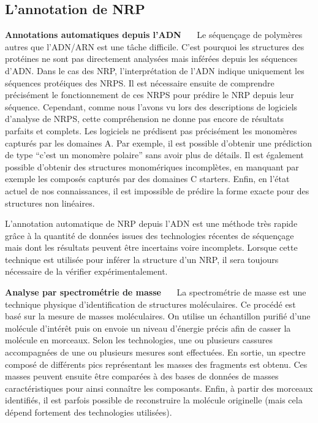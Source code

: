 \subsection{L'annotation de NRP}

\textbf{Annotations automatiques depuis l'ADN}~~~
Le séquençage de polymères autres que l'ADN/ARN est une tâche difficile.
C'est pourquoi les structures des protéines ne sont pas directement analysées mais inférées depuis les séquences d'ADN.
Dans le cas des NRP, l'interprétation de l'ADN indique uniquement les séquences protéiques des NRPS.
Il est nécessaire ensuite de comprendre précisément le fonctionnement de ces NRPS pour prédire le NRP depuis leur séquence.
Cependant, comme nous l'avons vu lors des descriptions de logiciels d'analyse de NRPS, cette compréhension ne donne pas encore de résultats parfaits et complets.
Les logiciels ne prédisent pas précisément les monomères capturés par les domaines A.
Par exemple, il est possible d'obtenir une prédiction de type ``c'est un monomère polaire'' sans avoir plus de détails.
Il est également possible d'obtenir des structures monomériques incomplètes, en manquant par exemple les composés capturés par des domaines C starters.
Enfin, en l'état actuel de nos connaissances, il est impossible de prédire la forme exacte pour des structures non linéaires.

L'annotation automatique de NRP depuis l'ADN est une méthode très rapide grâce à la quantité de données issues des technologies récentes de séquençage mais dont les résultats peuvent être incertains voire incomplets.
Lorsque cette technique est utilisée pour inférer la structure d'un NRP, il sera toujours nécessaire de la vérifier expérimentalement.


\textbf{Analyse par spectrométrie de masse}~~~
La spectrométrie de masse est une technique physique d'identification de structures moléculaires.
Ce procédé est basé sur la mesure de masses moléculaires.
On utilise un échantillon purifié d'une molécule d'intérêt puis on envoie un niveau d'énergie précis afin de casser la molécule en morceaux.
Selon les technologies, une ou plusieurs cassures accompagnées de une ou plusieurs mesures sont effectuées.
En sortie, un spectre composé de différents pics représentant les masses des fragments est obtenu.
Ces masses peuvent ensuite être comparées à des bases de données de masses caractéristiques pour ainsi connaître les composants.
Enfin, à partir des morceaux identifiés, il est parfois possible de reconstruire la molécule originelle (mais cela dépend fortement des technologies utilisées).

